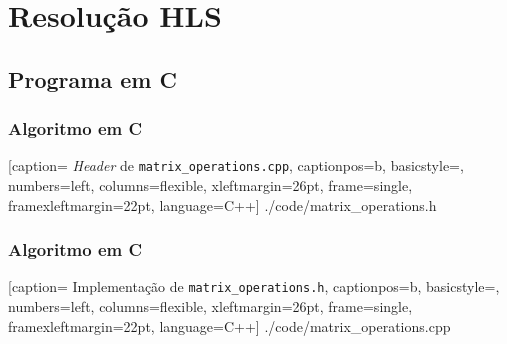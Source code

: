 \documentclass{beamer}
\begin{document}
    \section{Resolução HLS}
    \subsection{Programa em C}
    \begin{frame}
        \frametitle{Algoritmo em C}

        
        [caption= \textit{Header} de \texttt{matrix\_operations.cpp},
        captionpos=b,
        basicstyle=\tiny,
        numbers=left,
        columns=flexible,
        xleftmargin=26pt,
        frame=single,
        framexleftmargin=22pt,
        language=C++]
        {./code/matrix_operations.h}
    \end{frame}

    \begin{frame}
        \frametitle{Algoritmo em C}

        
        [caption= Implementação de \texttt{matrix\_operations.h},
        captionpos=b,
        basicstyle=\tiny,
        numbers=left,
        columns=flexible,
        xleftmargin=26pt,
        frame=single,
        framexleftmargin=22pt,
        language=C++]
        {./code/matrix_operations.cpp}
    \end{frame}
\end{document}
